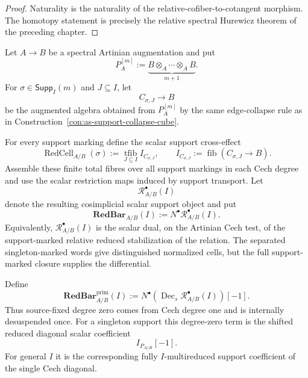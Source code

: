 \begin{proof}
Naturality is the naturality of the relative-cofiber-to-cotangent morphism.
The homotopy statement is precisely the relative spectral Hurewicz theorem of
the preceding chapter.
\end{proof}

Let $A\to B$ be a spectral Artinian augmentation and put
\[
    P_A^{[m]}
    :=
    \underbrace{B\otimes_A\cdots\otimes_A B}_{m+1}.
\]
For $\sigma\in\mathsf{Supp}_I(m)$ and $J\subseteq I$, let
\[
    C_{\sigma,J}\longrightarrow B
\]
be the augmented algebra obtained from $P_A^{[m]}$ by the same edge-collapse
rule as in Construction~\ref{con:as-support-collapse-cube}.

\begin{definition}
\label{def:as-reduced-scalar-marked-primitive}
For every support marking define the scalar support cross-effect
\[
    \operatorname{RedCell}_{A/B}(\sigma)
    :=
    \operatorname*{tfib}_{J\subseteq I}
    I_{C_{\sigma,J}},
    \qquad
    I_{C_{\sigma,J}}
    :=
    \operatorname{fib}(C_{\sigma,J}\to B).
\]
Assemble these finite total fibres over all support markings in each Cech
degree and use the scalar restriction maps induced by support transport.  Let
\[
\boxed{
    \mathscr R_{A/B}^{\bullet}(I)
}
\]
denote the resulting cosimplicial scalar support object and put
\[
\boxed{
    \mathbf{RedBar}_{A/B}(I)
    :=
    N^\bullet\mathscr R_{A/B}^{\bullet}(I).
}
\]
Equivalently, $\mathscr R_{A/B}^{\bullet}(I)$ is the scalar dual, on the
Artinian Cech test, of the support-marked relative reduced stabilization of
the relation.  The separated singleton-marked words give distinguished
normalized cells, but the full support-marked closure supplies the
differential.
\end{definition}

\begin{definition}
\label{def:as-primitive-reduced-bar}
Define
\[
\boxed{
    \mathbf{RedBar}^{\mathrm{prim}}_{A/B}(I)
    :=
    N^\bullet
    \left(
        \operatorname{Dec}_s
        \mathscr R_{A/B}^{\bullet}(I)
    \right)[-1].
}
\]
Thus source-fixed degree zero comes from Cech degree one and is internally
desuspended once.  For a singleton support this degree-zero term is the
shifted reduced diagonal scalar coefficient
\[
    I_{P_{A/B}}[-1].
\]
For general $I$ it is the corresponding fully $I$-multireduced support
coefficient of the single Cech diagonal.
\end{definition}

